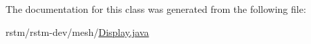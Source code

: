 The documentation for this class was generated from the following file\-:\begin{DoxyCompactItemize}
\item 
rstm/rstm-\/dev/mesh/\hyperlink{Display_8java}{Display.\-java}\end{DoxyCompactItemize}
